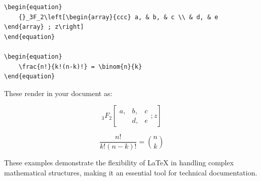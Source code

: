 \documentclass[12pt,journal,compsoc]{IEEEtran}
\begin{document}
\begin{verbatim}
\begin{equation}
    {}_3F_2\left[\begin{array}{ccc} a, & b, & c \\ & d, & e \end{array} ; z\right]
\end{equation}

\begin{equation}
    \frac{n!}{k!(n-k)!} = \binom{n}{k}
\end{equation}
\end{verbatim}

These render in your document as:

\begin{equation}
    {}_3F_2\left[\begin{array}{ccc} a, & b, & c \\ & d, & e \end{array} ; z\right]
\end{equation}

\begin{equation}
    \frac{n!}{k!(n-k)!} = \binom{n}{k}
\end{equation}

These examples demonstrate the flexibility of LaTeX in handling complex mathematical structures, making it an essential tool for technical documentation.
\end{document}
